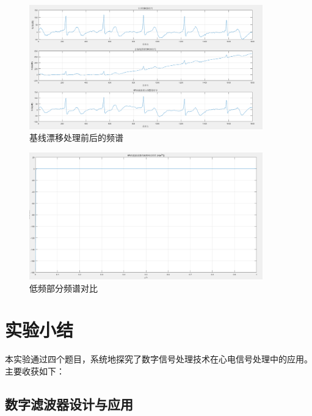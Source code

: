 \documentclass[12pt,hyperref,a4paper,UTF8]{ctexart}
\begin{document}
\begin{figure}[H] %
        \centering
        \includegraphics[width=0.9\textwidth]{figures/4_3.png} %
        \caption{基线漂移处理前后的频谱} %
        \label{fig:4_3} %
\end{figure}

\begin{figure}[H] %
        \centering
        \includegraphics[width=0.9\textwidth]{figures/4_4.png} %
        \caption{低频部分频谱对比} %
        \label{fig:4_4} %
\end{figure}

\section{实验小结}

本实验通过四个题目，系统地探究了数字信号处理技术在心电信号处理中的应用。主要收获如下：

\subsection{数字滤波器设计与应用}
\end{document}
